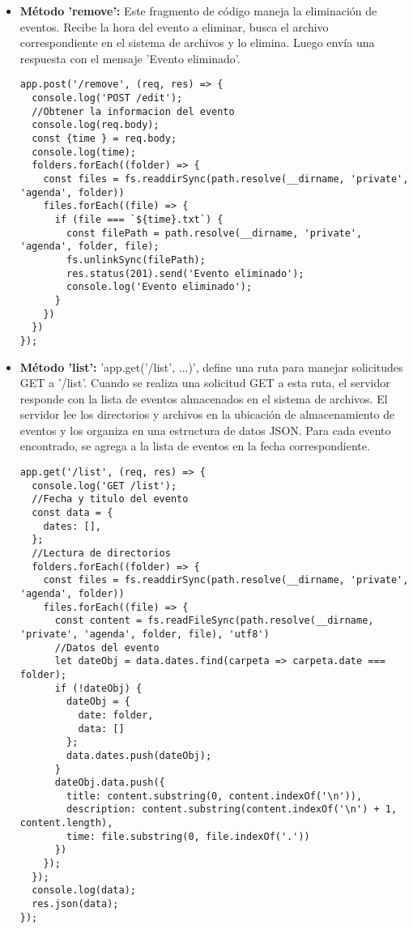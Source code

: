 \documentclass{article}
\begin{document}
\begin{itemize}
\begin{lstlisting}[style=ascii-tree]
\end{lstlisting}

\item{\textbf{Método 'remove':} Este fragmento de código maneja la eliminación de eventos. Recibe la hora del evento a eliminar, busca el archivo correspondiente en el sistema de archivos y lo elimina. Luego envía una respuesta con el mensaje 'Evento eliminado'.} 
\begin{lstlisting}[style=ascii-tree]
app.post('/remove', (req, res) => {
  console.log('POST /edit');
  //Obtener la informacion del evento
  console.log(req.body);
  const {time } = req.body;
  console.log(time);
  folders.forEach((folder) => {
    const files = fs.readdirSync(path.resolve(__dirname, 'private', 'agenda', folder))
    files.forEach((file) => {
      if (file === `${time}.txt`) {
        const filePath = path.resolve(__dirname, 'private', 'agenda', folder, file);
        fs.unlinkSync(filePath);
        res.status(201).send('Evento eliminado');
        console.log('Evento eliminado');
      }
    })
  })
});
\end{lstlisting}

\item{\textbf{Método 'list':} 'app.get('/list', ...)', define una ruta para manejar solicitudes GET a '/list'. Cuando se realiza una solicitud GET a esta ruta, el servidor responde con la lista de eventos almacenados en el sistema de archivos. El servidor lee los directorios y archivos en la ubicación de almacenamiento de eventos y los organiza en una estructura de datos JSON. Para cada evento encontrado, se agrega a la lista de eventos en la fecha correspondiente.} 
\begin{lstlisting}[style=ascii-tree]
app.get('/list', (req, res) => {
  console.log('GET /list');
  //Fecha y titulo del evento
  const data = {
    dates: [],
  };
  //Lectura de directorios
  folders.forEach((folder) => {
    const files = fs.readdirSync(path.resolve(__dirname, 'private', 'agenda', folder))
    files.forEach((file) => {
      const content = fs.readFileSync(path.resolve(__dirname, 'private', 'agenda', folder, file), 'utf8')
      //Datos del evento
      let dateObj = data.dates.find(carpeta => carpeta.date === folder);
      if (!dateObj) {
        dateObj = {
          date: folder,
          data: []
        };
        data.dates.push(dateObj);
      }
      dateObj.data.push({
        title: content.substring(0, content.indexOf('\n')),
        description: content.substring(content.indexOf('\n') + 1, content.length),
        time: file.substring(0, file.indexOf('.'))
      })
    });
  });
  console.log(data);
  res.json(data);
});
\end{lstlisting}

\end{itemize}
\end{document}
